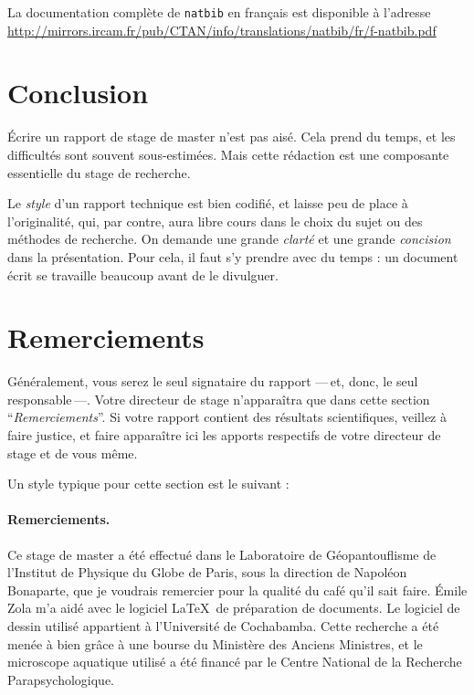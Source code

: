 \documentclass{ipgpmaster}
\begin{document}
 La documentation complète de \texttt{natbib} en français est disponible à l'adresse \\
\href{http://mirrors.ircam.fr/pub/CTAN/info/translations/natbib/fr/f-natbib.pdf}
{http://mirrors.ircam.fr/pub/CTAN/info/translations/natbib/fr/f-natbib.pdf}

\section{Conclusion}

Écrire un rapport de stage de master n'est pas aisé. 
Cela prend du temps, et les difficultés sont souvent sous-estimées.
Mais cette rédaction est une composante essentielle du stage de recherche.

Le \emph{style\/} d'un rapport technique est bien codifié, et laisse peu de place
à l'originalité, qui, par contre, aura libre cours dans le choix du sujet
ou des méthodes de recherche. On demande une grande \emph{ clarté\/} et une grande 
\emph{concision\/} dans la présentation. 
Pour cela, il faut s'y prendre avec du temps : un document écrit se travaille 
beaucoup avant de le divulguer.

\section{Remerciements}

Généralement, vous serez le seul signataire du rapport ---\,et, donc, le seul 
responsable\,---.
Votre directeur de stage n'apparaîtra que dans cette section 
``\emph{Remerciements\/}''. 
Si votre rapport contient des résultats scientifiques, veillez à faire justice, 
et faire apparaître ici les apports respectifs de votre directeur de stage
et de vous même.

Un style typique pour cette section est le suivant :

\paragraph*{Remerciements.} Ce stage de master a été effectué dans le 
Laboratoire de Géo\-pan\-tou\-flis\-me de 
l'Institut de Physique du Globe de Paris, sous la direction de Napoléon Bonaparte, 
que je voudrais remercier pour la qualité du café qu'il sait faire. 
Émile Zola m'a aidé avec le logiciel \LaTeX \ de préparation de documents. 
Le logiciel de dessin utilisé appartient à l'Université de Cochabamba.
Cette recherche a été menée à bien grâce à une bourse du 
Ministère des Anciens Ministres, et le microscope aquatique utilisé a 
été financé par le Centre National de la Recherche Parapsychologique. 
 
\end{document}

